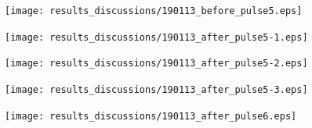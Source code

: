 \begin{figure}[htbp]
 \begin{minipage}{0.5\hsize}
  \begin{center}
   \texttt{[image: results\_discussions/190113\_before\_pulse5.eps]}
  \end{center}
  \caption{}
  \label{fig:190113_before_pulse5}
 \end{minipage}
 \begin{minipage}{0.5\hsize}
  \begin{center}
   \texttt{[image: results\_discussions/190113\_after\_pulse5-1.eps]}
  \end{center}
  \caption{}
  \label{fig:190113_after_pulse5-1}
 \end{minipage}
  \begin{minipage}{0.5\hsize}
  \begin{center}
   \texttt{[image: results\_discussions/190113\_after\_pulse5-2.eps]}
  \end{center}
  \caption{}
  \label{fig:190113_after_pulse5-2}
 \end{minipage}
  \begin{minipage}{0.5\hsize}
  \begin{center}
   \texttt{[image: results\_discussions/190113\_after\_pulse5-3.eps]}
  \end{center}
  \caption{}
  \label{fig:190113_after_pulse5-3}
 \end{minipage}
  \begin{minipage}{0.5\hsize}
  \begin{center}
   \texttt{[image: results\_discussions/190113\_after\_pulse6.eps]}
  \end{center}
  \caption{}
  \label{fig:190113_after_pulse6}
 \end{minipage}
\end{figure}



\clearpage

